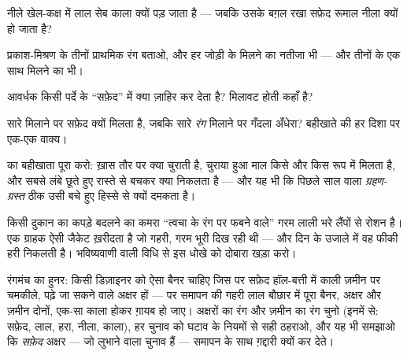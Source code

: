 \begin{exercise}[$\star$]\label{exo:g8:colors-spectra:6}
नीले खेल-कक्ष में लाल सेब काला क्यों पड़ जाता है --- जबकि उसके बग़ल
रखा सफ़ेद रूमाल नीला क्यों हो जाता है?
\end{exercise}

\begin{exercise}[$\star$]\label{exo:g8:colors-spectra:7}
प्रकाश-मिश्रण के तीनों प्राथमिक रंग बताओ, और हर जोड़ी के मिलने का
नतीजा भी --- और तीनों के एक साथ मिलने का भी।
\end{exercise}

\begin{exercise}[$\star$]\label{exo:g8:colors-spectra:8}
आवर्धक किसी पर्दे के ``सफ़ेद'' में क्या ज़ाहिर कर देता है? मिलावट होती
कहाँ है?
\end{exercise}

\begin{exercise}[$\star\star$]\label{exo:g8:colors-spectra:9}
सारे \emph{} मिलाने पर सफ़ेद क्यों मिलता है, जबकि सारे
\emph{रंग} मिलाने पर गँदला अँधेरा? बहीखाते की हर दिशा पर एक-एक वाक्य।
\end{exercise}

\begin{exercise}[$\star\star$]\label{exo:g8:colors-spectra:10}
 का बहीखाता पूरा करो:  ख़ास तौर पर क्या चुराती है, चुराया
हुआ माल किसे और किस रूप में मिलता है, और सबसे लंबे छूते हुए रास्ते से
बचकर क्या निकलता है --- और यह भी कि पिछले साल वाला
\emph{ग्रहण-ग्रस्त } ठीक उसी बचे हुए हिस्से से क्यों दमकता है।
\end{exercise}

\begin{exercise}[$\star\star$]\label{exo:g8:colors-spectra:11}
किसी दुकान का कपड़े बदलने का कमरा ``त्वचा के रंग पर फबने वाले'' गरम
लाली भरे लैंपों से रोशन है। एक ग्राहक ऐसी जैकेट ख़रीदता है जो गहरी,
गरम भूरी दिख रही थी --- और दिन के उजाले में वह फीकी हरी निकलती है।
भविष्यवाणी वाली विधि से इस धोखे को दोबारा खड़ा करो।
\end{exercise}

\begin{exercise}[$\star\star\star$]\label{exo:g8:colors-spectra:12}
रंगमंच का हुनर: किसी डिज़ाइनर को ऐसा बैनर चाहिए जिस पर सफ़ेद हॉल-बत्ती
में काली ज़मीन पर चमकीले, पढ़े जा सकने वाले अक्षर हों --- पर समापन की
गहरी लाल बौछार में पूरा बैनर, अक्षर और ज़मीन दोनों, एक-सा काला होकर
ग़ायब हो जाए। अक्षरों का रंग और ज़मीन का रंग चुनो (इनमें से: सफ़ेद,
लाल, हरा, नीला, काला), हर चुनाव को घटाव के नियमों से सही ठहराओ, और यह
भी समझाओ कि \emph{सफ़ेद} अक्षर --- जो लुभाने वाला चुनाव हैं --- समापन
के साथ ग़द्दारी क्यों कर देते।
\end{exercise}

